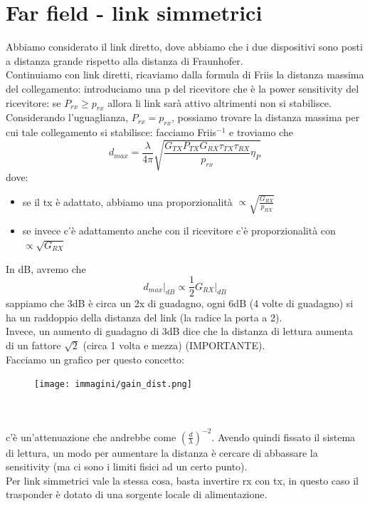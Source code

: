 \documentclass[oneside, 12pt]{extbook}
\begin{document}
\section{Far field - link simmetrici}
Abbiamo considerato il link diretto, dove abbiamo che i due dispositivi sono posti a distanza grande rispetto alla distanza di Fraunhofer.\\Continuiamo con link diretti, ricaviamo dalla formula di Friis la distanza massima del collegamento: introduciamo una p del ricevitore che è la power sensitivity del ricevitore: se $P_{rx} \geq p_{rx}$ allora li link sarà attivo altrimenti non si stabilisce.\\Considerando l'uguaglianza, $P_{rx} = p_{rx}$, possiamo trovare la distanza massima per cui tale collegamento si stabilisce: facciamo Friis$^{-1}$ e troviamo che
\begin{equation}
	d_{max} = \frac{\lambda}{4\pi} \sqrt{\dfrac{G_{TX} P_{TX}G_{RX}\tau_{TX} \tau_{RX}}{p_{rx}} \eta_P}	
\end{equation}
dove:
\begin{itemize}
	\item se il tx è adattato, abbiamo una proporzionalità $\propto \sqrt{\frac{G_{RX}}{p_{RX}}}$
	\item se invece c'è adattamento anche con il ricevitore c'è proporzionalità con  $\propto \sqrt{G_{RX}}$
\end{itemize}
In dB, avremo che 
\begin{equation}
	d_{max}\bigg\rvert_{dB} \propto \frac{1}{2} G_{RX}\bigg\rvert_{dB}
\end{equation}
sappiamo che 3dB è circa un 2x di guadagno, ogni 6dB (4 volte di guadagno) si ha un raddoppio della distanza del link (la radice la porta a 2).\\Invece, un aumento di guadagno di 3dB dice che la distanza di lettura aumenta di un fattore $\sqrt{2}$ (circa 1 volta e mezza) (IMPORTANTE).\\Facciamo un grafico per questo concetto:\\
\begin{figure}[!h]
	\texttt{[image: immagini/gain\_dist.png]}
\end{figure}\\\\
c'è un'attenuazione che andrebbe come $(\frac{d}{\lambda})^{-2}$. Avendo quindi fissato il sistema di lettura, un modo per aumentare la distanza è cercare di abbassare la sensitivity (ma ci sono i limiti fisici ad un certo punto).\\Per link simmetrici vale la stessa cosa, basta invertire rx con tx, in questo caso il trasponder è dotato di una sorgente locale di alimentazione.
\end{document}
